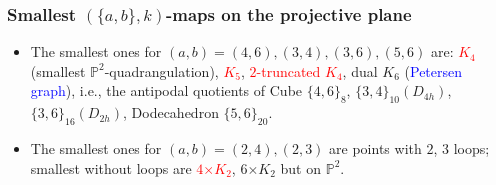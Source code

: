 \documentclass{beamer}
\begin{document}
\begin{frame}\frametitle{Smallest $(\{a,b\},k)$-maps on  the projective plane}
\vspace{-3mm}
\begin{itemize}

\item The smallest ones for $(a,b)=(4,6),(3,4),(3,6),(5,6)$ are:
\textcolor{red}{$K_4$} (smallest $\mathbb{P}^2$-quadrangulation), \textcolor{red}{$K_5$},  
\textcolor{red}{$2$-truncated 
$K_4$}, dual $K_6$
(\textcolor{blue}{Petersen  
graph}), i.e., the  antipodal quotients of
 Cube $\{4,6\}_{8}$,
 $\{3,4\}_{10}(D_{4h})$,
 $\{3,6\}_{16}(D_{2h})$,  Dodecahedron $\{5,6\}_{20}$.
\item The smallest ones for  $(a,b)=(2,4),(2,3)$ are
points with $2$, $3$ loops; smallest
without loops are \textcolor{red}{$4$$\times$$K_2$}, $6$$\times$$K_2$ but 
on
$\mathbb{P}^2$. \end{itemize}



\end{frame}
\end{document}
